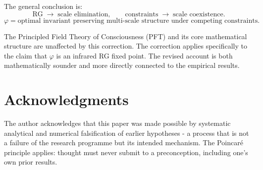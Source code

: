\documentclass[11pt,a4paper]{article}
\theoremstyle{plain}
\theoremstyle{definition}
\newcommand{\phiGolden}{\varphi}
\begin{document}
The general conclusion is:
\begin{equation}
\text{RG} \;\rightarrow\; \text{scale elimination}, \qquad
\text{constraints} \;\rightarrow\; \text{scale coexistence}.
\end{equation}
\begin{equation}
\phiGolden = \text{optimal invariant preserving multi-scale structure
under competing constraints.}
\end{equation}

The Principled Field Theory of Consciousness (PFT) and its core mathematical
structure are unaffected by this correction. The correction applies
specifically to the claim that $\phiGolden$ is an infrared RG fixed point.
The revised account is both mathematically sounder and more directly
connected to the empirical results.


\section*{Acknowledgments}

The author acknowledges that this paper was made possible by systematic
analytical and numerical falsification of earlier hypotheses - a process
that is not a failure of the research programme but its intended mechanism.
The Poincaré principle applies: thought must never submit to a
preconception, including one's own prior results.
\end{document}
